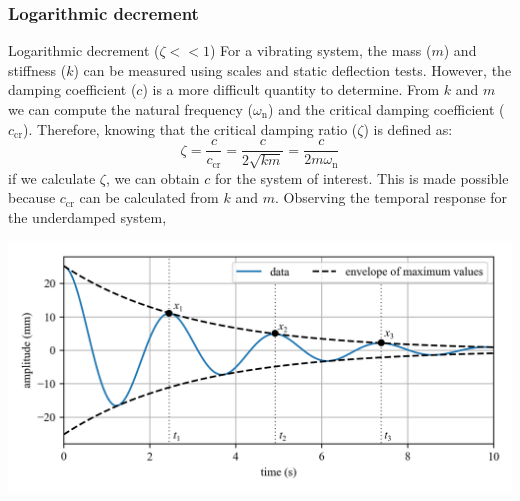 \documentclass[12pt,letter]{article}
\numberwithin{ex}{section} %
\numberwithin{re}{section} %
\numberwithin{equation}{section}	%
\begin{document}
\subsubsection{Logarithmic decrement}



Logarithmic decrement ($\zeta << 1$) For a vibrating system, the  mass ($m$) and stiffness ($k$) can be measured using scales and static deflection tests. However, the damping coefficient ($c$) is a more difficult quantity to determine. From $k$ and $m$ we can compute the natural frequency ($\omega_\text{n}$) and the critical damping coefficient ($c_\text{cr}$). Therefore, knowing that the critical damping ratio ($\zeta$) is defined as:
			\begin{equation}
				\zeta = \frac{c}{c_{\text{cr}}} = \frac{c}{2\sqrt{km}} = \frac{c}{2m\omega_\text{n}}
			\end{equation}				
			if we calculate $\zeta$, we can obtain $c$ for the system of interest. This is made possible because $c_\text{cr}$ can be calculated from $k$ and $m$. Observing the temporal response for the underdamped system, 

	        \begin{minipage}{\linewidth}
	            \centering
	            \includegraphics[width=\linewidth]{../figures/Logarithmic_decrement.png}
	        \end{minipage}
			
\end{document}
